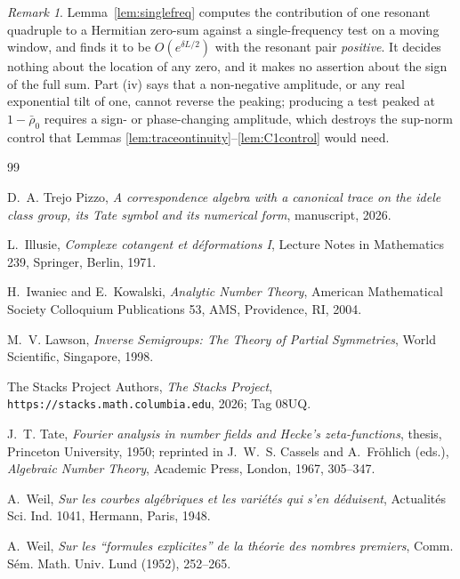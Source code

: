\documentclass[11pt]{amsart}
\theoremstyle{definition}
\theoremstyle{remark}
\newtheorem{remark}[theorem]{Remark}
\begin{document}
\begin{remark}\label{rem:singlefreqscope}
Lemma~\ref{lem:singlefreq} computes the contribution of one resonant quadruple to a Hermitian
zero-sum against a single-frequency test on a moving window, and finds it to be
$O(e^{\delta L/2})$ with the resonant pair \emph{positive}. It decides nothing
about the location of any zero, and it makes no assertion about the sign of the
full sum. Part (iv) says that a non-negative amplitude, or any real
exponential tilt of one, cannot reverse the peaking; producing a test peaked at
$1-\bar\rho_0$ requires a sign- or phase-changing amplitude, which destroys the
sup-norm control that Lemmas \ref{lem:traceontinuity}--\ref{lem:C1control}
would need.
\end{remark}

\begin{thebibliography}{99}

D.~A. Trejo Pizzo,
\emph{A correspondence algebra with a canonical trace on the idele class
group, its Tate symbol and its numerical form}, manuscript, 2026.

L.~Illusie,
\emph{Complexe cotangent et d\'eformations I},
Lecture Notes in Mathematics 239, Springer, Berlin, 1971.

H.~Iwaniec and E.~Kowalski,
\emph{Analytic Number Theory},
American Mathematical Society Colloquium Publications 53, AMS, Providence, RI,
2004.

M.~V. Lawson,
\emph{Inverse Semigroups: The Theory of Partial Symmetries},
World Scientific, Singapore, 1998.

The Stacks Project Authors,
\emph{The Stacks Project}, \texttt{https://stacks.math.columbia.edu}, 2026;
Tag 08UQ.

J.~T. Tate,
\emph{Fourier analysis in number fields and Hecke's zeta-functions},
thesis, Princeton University, 1950; reprinted in
J.~W.~S. Cassels and A.~Fr\"ohlich (eds.), \emph{Algebraic Number Theory},
Academic Press, London, 1967, 305--347.

A.~Weil,
\emph{Sur les courbes alg\'ebriques et les vari\'et\'es qui s'en d\'eduisent},
Actualit\'es Sci. Ind. 1041, Hermann, Paris, 1948.

A.~Weil,
\emph{Sur les ``formules explicites'' de la th\'eorie des nombres premiers},
Comm. S\'em. Math. Univ. Lund (1952), 252--265.

\end{thebibliography}
\end{document}
